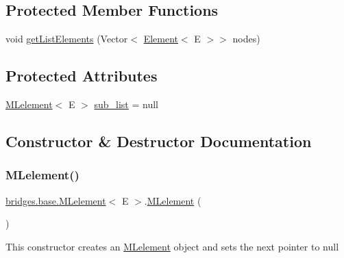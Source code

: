 \subsection*{Protected Member Functions}
\begin{DoxyCompactItemize}
\item 
void \mbox{\hyperlink{classbridges_1_1base_1_1_m_lelement_a496378739f031ef451a6ab1f63c5770f}{get\+List\+Elements}} (Vector$<$ \mbox{\hyperlink{classbridges_1_1base_1_1_element}{Element}}$<$ E $>$$>$ nodes)
\end{DoxyCompactItemize}
\subsection*{Protected Attributes}
\begin{DoxyCompactItemize}
\item 
\mbox{\hyperlink{classbridges_1_1base_1_1_m_lelement}{M\+Lelement}}$<$ E $>$ \mbox{\hyperlink{classbridges_1_1base_1_1_m_lelement_a7dee2985f9a8134d3076eb9478422403}{sub\+\_\+list}} = null
\end{DoxyCompactItemize}


\subsection{Constructor \& Destructor Documentation}
\mbox{\label{classbridges_1_1base_1_1_m_lelement_a721d1369c297dc3a3617a1476cb6f5f8}} 
\subsubsection{\texorpdfstring{MLelement()}{MLelement()}\hspace{0.1cm}{\footnotesize\ttfamily [1/4]}}
{\footnotesize\ttfamily \mbox{\hyperlink{classbridges_1_1base_1_1_m_lelement}{bridges.\+base.\+M\+Lelement}}$<$ E $>$.\mbox{\hyperlink{classbridges_1_1base_1_1_m_lelement}{M\+Lelement}} (\begin{DoxyParamCaption}{ }\end{DoxyParamCaption})}

This constructor creates an \mbox{\hyperlink{classbridges_1_1base_1_1_m_lelement}{M\+Lelement}} object and sets the next pointer to null \mbox{\label{classbridges_1_1base_1_1_m_lelement_ad0437d26107039d98cdba6277cff19e2}} 
